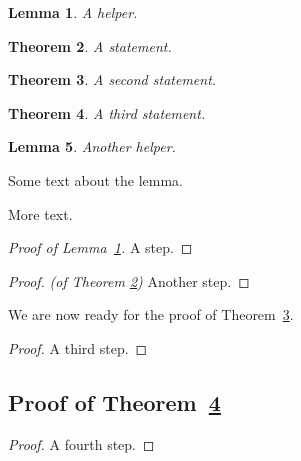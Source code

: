 \documentclass{article}
\newtheorem{theorem}{Theorem}
\newtheorem{lemma}[theorem]{Lemma}
\newcommand{\refl}[1]{Lemma~\ref{l:#1}}
\begin{document}
\begin{lemma}\label{l:gap}
A helper.
\end{lemma}
\begin{theorem}\label{first}
A statement.
\end{theorem}
\begin{theorem}\label{second}
A second statement.
\end{theorem}
\begin{theorem}\label{third}
A third statement.
\end{theorem}
\begin{lemma}
Another helper.
\end{lemma}
Some text about the lemma.

More text.

\begin{proof}[Proof of \refl{gap}]
A step.
\end{proof}
\begin{proof} \textit{(of Theorem \ref{first})}
Another step.
\end{proof}
We are now ready for the proof of Theorem~\ref{second}.\\
\begin{proof}
A third step.
\end{proof}
\subsection{Proof of Theorem~\ref{third}}
\label{secproof}
\begin{proof}
A fourth step.
\end{proof}
\end{document}
